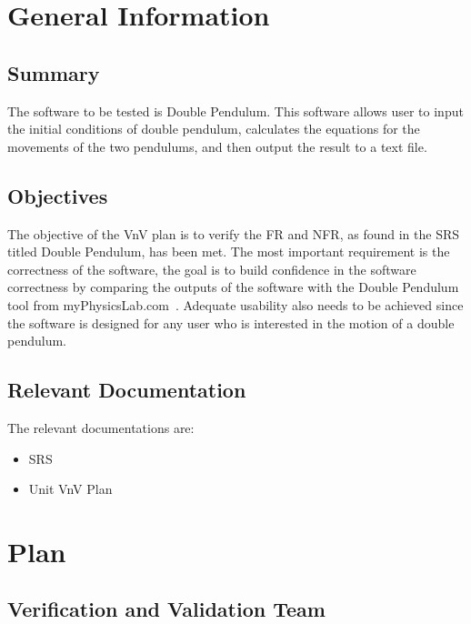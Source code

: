 \documentclass[12pt, titlepage]{article}
\begin{document}
\section{General Information}\label{sec_generalInfo}

\subsection{Summary}

The software to be tested is Double Pendulum. This software allows user to input
the initial conditions of double pendulum, calculates the equations for the
movements of the two pendulums, and then output the result to a text file.

\subsection{Objectives}

The objective of the VnV plan is to verify the FR and NFR, as found in the SRS
titled Double Pendulum, has been met. The most important requirement is the
correctness of the software, the goal is to build confidence in the software
correctness by comparing the outputs of the software with the Double Pendulum
tool from myPhysicsLab.com~\cite{Double_Pendulum}. Adequate usability also needs
to be achieved since the software is designed for any user who is interested in
the motion of a double pendulum.
 
\subsection{Relevant Documentation}

The relevant documentations are:
\begin{itemize}
    \item SRS
    \item Unit VnV Plan
\end{itemize}


\section{Plan}\label{sec_Plan}
	

\subsection{Verification and Validation Team}
\end{document}
